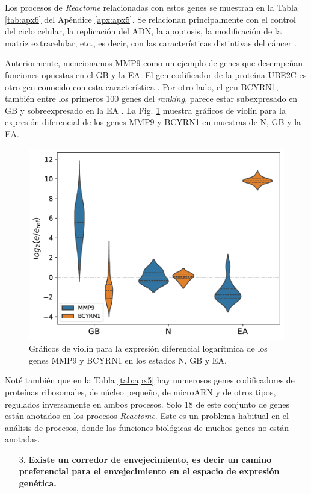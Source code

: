 Los procesos de \textit{Reactome} relacionadas con estos genes se muestran en la Tabla \ref{tab:apx6} del Apéndice \ref{apx:apx5}. Se relacionan principalmente con el control del ciclo celular, la replicación del ADN, la apoptosis, la modificación de la matriz extracelular, etc., es decir, con las características distintivas del cáncer \cite{Hanahan_2000, Hanahan_2011, Hanahan_2022}.

Anteriormente, mencionamos MMP9 como un ejemplo de genes que desempeñan funciones opuestas en el GB y la EA. El gen codificador de la proteína UBE2C es otro gen conocido con esta característica \cite{MA_2016, Jaladanki_2021}. Por otro lado, el gen BCYRN1, también entre los primeros 100 genes del \textit{ranking}, parece estar subexpresado en GB \cite{Mu2021} y sobreexpresado en la EA \cite{Zhang_2021}. La Fig. \ref{fig:fig1d} muestra gráficos de violín para la expresión diferencial de los genes MMP9 y BCYRN1 en muestras de N, GB y la EA.

\begin{figure}[!htb]
	\centering
	\includegraphics[width=0.75\linewidth]{figures/Fig_1d.pdf}
	\caption{Gráficos de violín para la expresión diferencial logarítmica de los genes MMP9 y BCYRN1 en los estados N, GB y EA.}
	\label{fig:fig1d}
\end{figure}

Noté también que en la Tabla \ref{tab:apx5} hay numerosos genes codificadores de proteínas ribosomales, de núcleo pequeño, de microARN y de otros tipos, regulados inversamente en ambos procesos. Solo 18 de este conjunto de genes están anotados en los procesos \textit{Reactome}. Este es un problema habitual en el análisis de procesos, donde las funciones biológicas de muchos genes no están anotadas.

\begin{enumerate}
	\item[3.] \textbf{Existe un corredor de envejecimiento, es decir un camino preferencial para el envejecimiento en el espacio de expresión genética.}
\end{enumerate}

